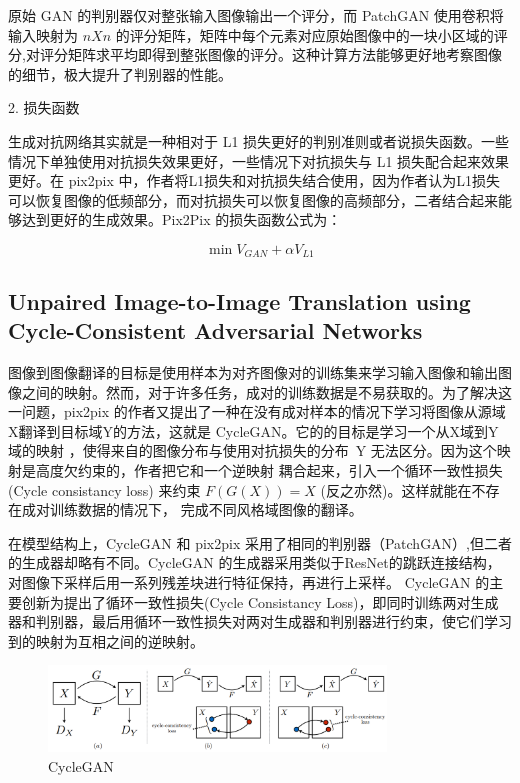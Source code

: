 原始 GAN 的判别器仅对整张输入图像输出一个评分，而 PatchGAN 使用卷积将输入映射为 $nXn$ 的评分矩阵，矩阵中每个元素对应原始图像中的一块小区域的评分,对评分矩阵求平均即得到整张图像的评分。这种计算方法能够更好地考察图像的细节，极大提升了判别器的性能。

2. 损失函数

生成对抗网络其实就是一种相对于 L1 损失更好的判别准则或者说损失函数。一些情况下单独使用对抗损失效果更好，一些情况下对抗损失与 L1 损失配合起来效果更好。在 pix2pix 中，作者将L1损失和对抗损失结合使用，因为作者认为L1损失可以恢复图像的低频部分，而对抗损失可以恢复图像的高频部分，二者结合起来能够达到更好的生成效果。Pix2Pix 的损失函数公式为：

\begin{equation}
\min V_{G A N}+\alpha V_{L 1}
\end{equation}

\subsection{Unpaired Image-to-Image Translation using Cycle-Consistent Adversarial Networks}

图像到图像翻译的目标是使用样本为对齐图像对的训练集来学习输入图像和输出图像之间的映射。然而，对于许多任务，成对的训练数据是不易获取的。为了解决这一问题，pix2pix 的作者又提出了一种在没有成对样本的情况下学习将图像从源域X翻译到目标域Y的方法，这就是 CycleGAN。它的的目标是学习一个从X域到Y域的映射 ，使得来自的图像分布与使用对抗损失的分布\ Y 无法区分。因为这个映射是高度欠约束的，作者把它和一个逆映射 耦合起来，引入一个循环一致性损失 (Cycle consistancy loss) 来约束 $F\left(G\left(X\right)\right)=X$ (反之亦然)。这样就能在不存在成对训练数据的情况下， 完成不同风格域图像的翻译。

在模型结构上，CycleGAN 和 pix2pix 采用了相同的判别器（PatchGAN）,但二者的生成器却略有不同。CycleGAN 的生成器采用类似于ResNet的跳跃连接结构，对图像下采样后用一系列残差块进行特征保持，再进行上采样。 CycleGAN 的主要创新为提出了循环一致性损失(Cycle Consistancy Loss)，即同时训练两对生成器和判别器，最后用循环一致性损失对两对生成器和判别器进行约束，使它们学习到的映射为互相之间的逆映射。

\begin{figure}[htb]
\centering 
\includegraphics[width=0.8\textwidth]{img/m2t8.png} 
\caption{CycleGAN}
\label{Test}
\end{figure}

